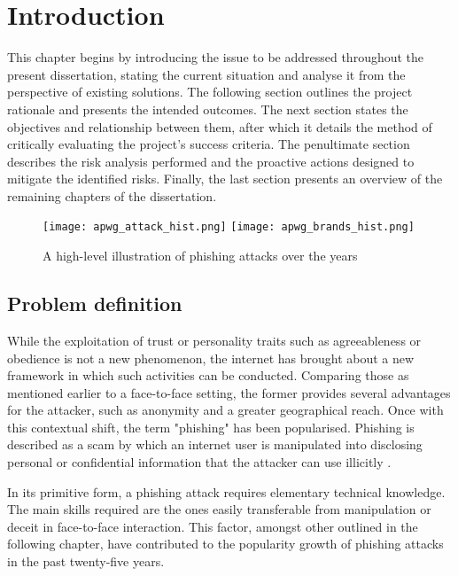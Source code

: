\chapter{Introduction}
\label{chap:introduction}
This chapter begins by introducing the issue to be addressed throughout the present dissertation, stating the current situation and analyse it from the perspective of existing solutions. The following section outlines the project rationale and presents the intended outcomes. The next section states the objectives and relationship between them, after which it details the method of critically evaluating the project's success criteria. The penultimate section describes the risk analysis performed and the proactive actions designed to mitigate the identified risks. Finally, the last section presents an overview of the remaining chapters of the dissertation.

\begin{figure}[b]
	\centering
	\texttt{[image: apwg\_attack\_hist.png]}
	\texttt{[image: apwg\_brands\_hist.png]}
	\caption{A high-level illustration of phishing attacks over the years \citep{APWG}}
	\label{fig:PHISHING_HISTORY}
\end{figure}

\section{Problem definition}
\label{sec:problem_definition}
While the exploitation of trust or personality traits such as agreeableness or obedience is not a new phenomenon, the internet has brought about a new framework in which such activities can be conducted. Comparing those as mentioned earlier to a face-to-face setting, the former provides several advantages for the attacker, such as anonymity and a greater geographical reach. Once with this contextual shift, the term "phishing" has been popularised. Phishing is described as a scam by which an internet user is manipulated into disclosing personal or confidential information that the attacker can use illicitly \citep{Merriam_Webster}.

In its primitive form, a phishing attack requires elementary technical knowledge. The main skills required are the ones easily transferable from manipulation or deceit in face-to-face interaction. This factor, amongst other outlined in the following chapter, have contributed to the popularity growth of phishing attacks in the past twenty-five years.

